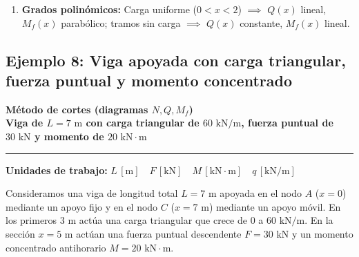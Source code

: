 {\begin{enumerate}
\begin{itemize}
                  \item En $x = 4\text{ m}$ actúa un momento puntual antihorario de $M = 4\text{ kN}\cdot\text{m}$: salto positivo en el momento flector $\Delta M_f = 12.80 - 8.80 = +4.00\text{ kN}\cdot\text{m}$.

              \end{itemize}

        \item \textbf{Grados polinómicos:} Carga uniforme ($0 < x < 2$) $\implies$ $Q(x)$ lineal, $M_f(x)$ parabólico; tramos sin carga $\implies$ $Q(x)$ constante, $M_f(x)$ lineal.

    \end{enumerate}

}







\subsection{Ejemplo 8: Viga apoyada con carga triangular, fuerza puntual y momento concentrado}



\begin{tcolorbox}[colback=blue!3!white, colframe=blue!40!black, arc=3pt, boxrule=0.8pt, left=8pt, right=8pt, top=6pt, bottom=6pt]

    \centering

    {\Large\bfseries\color{blue!60!black} Método de cortes (diagramas $N, Q, M_f$)}\\[2pt]

    {\normalsize\bfseries Viga de $L = 7\text{ m}$ con carga triangular de $60\text{ kN/m}$, fuerza puntual de $30\text{ kN}$ y momento de $20\text{ kN}\cdot\text{m}$}



    \vspace{4pt}\hrule\vspace{4pt}

    {\small\textbf{Unidades de trabajo:} $L\,[\text{m}] \quad F\,[\text{kN}] \quad M\,[\text{kN}\cdot\text{m}] \quad q\,[\text{kN/m}]$}

\end{tcolorbox}






Consideramos una viga de longitud total $L = 7\text{ m}$ apoyada en el nodo $A$ ($x=0$) mediante un apoyo fijo y en el nodo $C$ ($x=7\text{ m}$) mediante un apoyo móvil. En los primeros $3\text{ m}$ actúa una carga triangular que crece de $0$ a $60\text{ kN/m}$. En la sección $x = 5\text{ m}$ actúan una fuerza puntual descendente $F = 30\text{ kN}$ y un momento concentrado antihorario $M = 20\text{ kN}\cdot\text{m}$.




